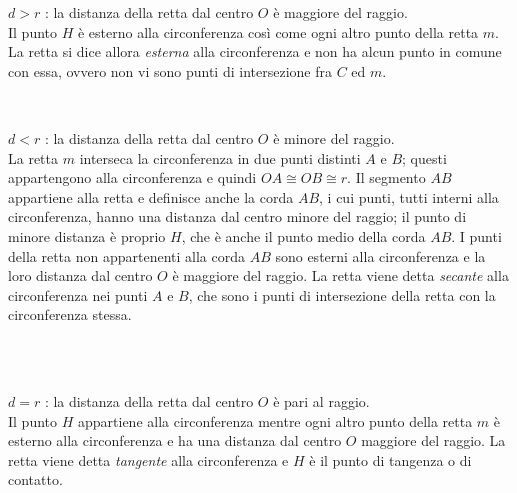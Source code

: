 \begin{enumeratea}

\noindent\begin{minipage}{0.6\textwidth}\parindent15pt
\item $d > r$ : la distanza della retta dal centro $O$ è maggiore del 
raggio.\\
Il punto $H$ è esterno alla circonferenza così come ogni altro punto 
della retta $m$. La retta si dice allora \emph{esterna} alla 
circonferenza e non ha alcun punto in comune con essa, ovvero non vi 
sono punti di intersezione fra $C$ ed $m$.
\end{minipage}\hfil
\begin{minipage}{0.4\textwidth}
  \centering\\\vspace{5pt}
\end{minipage}\vspace{4pt}

\noindent\begin{minipage}{0.6\textwidth}\parindent15pt
\item $d < r$ : la distanza della retta dal centro $O$ è minore del 
raggio.\\
La retta $m$ interseca la circonferenza in due punti distinti $A$ e 
$B$; questi appartengono alla circonferenza e quindi $OA\cong OB\cong 
r$. Il segmento $AB$ appartiene alla retta e definisce anche la corda 
$AB$, i cui punti, tutti interni alla circonferenza, hanno una 
distanza dal centro minore del raggio; il punto di minore distanza è 
proprio $H$, che è anche il punto medio della corda $AB$. I punti 
della retta non appartenenti alla corda $AB$ sono esterni alla 
circonferenza e la loro distanza dal centro $O$ è maggiore del raggio.
La retta viene detta \emph{secante} alla circonferenza nei punti $A$ 
e $B$, che sono i punti di intersezione della retta con la 
circonferenza stessa.
\end{minipage}\hfil
\begin{minipage}{0.4\textwidth}
  \centering\\\vspace{4pt}
  \centering\\\vspace{4pt}
\end{minipage}\vspace{4pt}

\item $d = r$ : la distanza della retta dal centro $O$ è pari al 
raggio.\\
Il punto $H$ appartiene alla circonferenza mentre ogni altro punto 
della retta $m$ è esterno alla circonferenza e ha una distanza dal 
centro $O$ maggiore del raggio. La retta viene detta \emph{tangente} 
alla circonferenza e $H$ è il punto di tangenza o di contatto.

\end{enumeratea}

